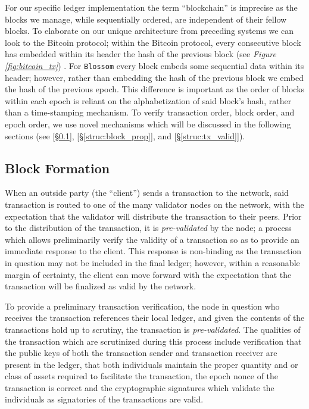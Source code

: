 For our specific ledger implementation the term “blockchain” is imprecise as the blocks we manage, while sequentially ordered, are independent of their fellow blocks. To elaborate  on our unique architecture from preceding systems we can look to the Bitcoin protocol; within the Bitcoin protocol, every consecutive block has embedded within its header the hash of the previous block (see \textit{Figure \ref{fig:bitcoin_tx}}) \cite{Nakamoto2008}. For \texttt{Blossom} every block embeds some sequential data within its header; however, rather than embedding the hash of the previous block we embed the hash of the previous epoch. This difference is important as the order of blocks within each epoch is reliant on the alphabetization of said block’s hash, rather than a time-stamping mechanism. To verify transaction order, block order, and epoch order, we use novel mechanisms which will be discussed in the following sections (see \textit{} [\S\ref{struc:block_form}], \textit{} [\S\ref{struc:block_prop}], and \textit{} [\S\ref{struc:tx_valid}]).



\subsection{Block Formation}\label{struc:block_form}
When an outside party (the “client”) sends a transaction to the network, said transaction is routed to one of the many validator nodes on the network, with the expectation that the validator will distribute the transaction to their peers. Prior to the distribution of the transaction, it is \textit{pre-validated} by the node; a process which allows preliminarily verify the validity of a transaction so as to provide an immediate response to the client. This response is non-binding as the transaction in question may not be included in the final ledger; however, within a reasonable margin of certainty, the client can move forward with the expectation that the transaction will be finalized as valid by the network.

To provide a preliminary transaction verification, the node in question who receives the transaction references their local ledger, and given the contents of the transactions hold up to scrutiny, the transaction is \textit{pre-validated}. The qualities of the transaction which are scrutinized during this process include verification that the public keys of both the transaction sender and transaction receiver are present in the ledger, that both individuals maintain the proper quantity and or class of assets required to facilitate the transaction, the epoch nonce of the transaction is correct and the cryptographic signatures which validate the individuals as signatories of the transactions are valid.


